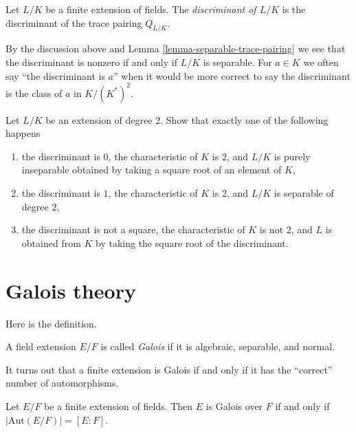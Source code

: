 \begin{definition}
\label{definition-discriminant}
Let $L/K$ be a finite extension of fields. The
{\it discriminant of $L/K$} is the discriminant of
the trace pairing $Q_{L/K}$.
\end{definition}

\noindent
By the discussion above and Lemma \ref{lemma-separable-trace-pairing}
we see that the discriminant is nonzero if and only
if $L/K$ is separable. For $a \in K$ we often say
``the discriminant is $a$'' when it would be more correct
to say the discriminant is the class of $a$ in $K/(K^*)^2$.

\begin{exercise}
\label{exercise-quadratic-discriminant}
Let $L/K$ be an extension of degree $2$. Show that exactly
one of the following happens
\begin{enumerate}
\item the discriminant is $0$, the characteristic of $K$ is $2$,
and $L/K$ is purely inseparable obtained by taking a square root
of an element of $K$,
\item the discriminant is $1$, the characteristic of $K$ is $2$, and
$L/K$ is separable of degree $2$,
\item the discriminant is not a square, the characteristic of $K$
is not $2$, and $L$ is obtained from $K$ by taking the square root
of the discriminant.
\end{enumerate}
\end{exercise}











\section{Galois theory}
\label{section-galois-theory}

\noindent
Here is the definition.

\begin{definition}
\label{definition-galois}
A field extension $E/F$ is called {\it Galois} if it is algebraic,
separable, and normal.
\end{definition}

\noindent
It turns out that a finite extension is Galois if and only if it has
the ``correct'' number of automorphisms.

\begin{lemma}
\label{lemma-finite-Galois}
Let $E/F$ be a finite extension of fields. Then $E$ is Galois over $F$
if and only if $|\text{Aut}(E/F)| = [E : F]$.
\end{lemma}

